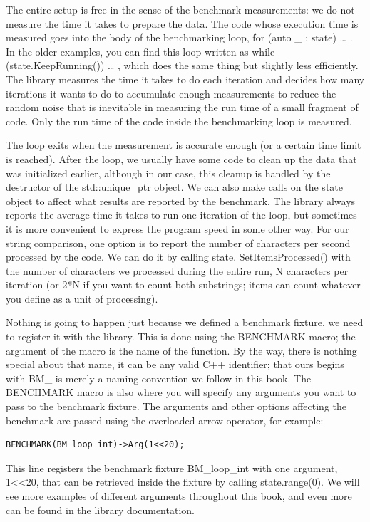The entire setup is free in the sense of the benchmark measurements: we do not measure the time it takes to prepare the data. The code whose execution time is measured goes into the body of the benchmarking loop, for (auto \_ : state) { … }. In the older examples, you can find this loop written as while (state.KeepRunning()) { … }, which does the same thing but slightly less efficiently. The library measures the time it takes to do each iteration and decides how many iterations it wants to do to accumulate enough measurements to reduce the random noise that is inevitable in measuring the run time of a small fragment of code. Only the run time of the code inside the benchmarking loop is measured.

The loop exits when the measurement is accurate enough (or a certain time limit is reached). After the loop, we usually have some code to clean up the data that was initialized earlier, although in our case, this cleanup is handled by the destructor of the std::unique\_ptr object. We can also make calls on the state object to affect what results are reported by the benchmark. The library always reports the average time it takes to run one iteration of the loop, but sometimes it is more convenient to express the program speed in some other way. For our string comparison, one option is to report the number of characters per second processed by the code. We can do it by calling state. SetItemsProcessed() with the number of characters we processed during the entire run, N characters per iteration (or 2*N if you want to count both substrings; items can count whatever you define as a unit of processing).

Nothing is going to happen just because we defined a benchmark fixture, we need to register it with the library. This is done using the BENCHMARK macro; the argument of the macro is the name of the function. By the way, there is nothing special about that name, it can be any valid C++ identifier; that ours begins with BM\_ is merely a naming convention we follow in this book. The BENCHMARK macro is also where you will specify any arguments you want to pass to the benchmark fixture. The arguments and other options affecting the benchmark are passed using the overloaded arrow operator, for example:

\begin{lstlisting}[style=styleCXX]
BENCHMARK(BM_loop_int)->Arg(1<<20);
\end{lstlisting}

This line registers the benchmark fixture BM\_loop\_int with one argument, 1<<20, that can be retrieved inside the fixture by calling state.range(0). We will see more examples of different arguments throughout this book, and even more can be found in the library documentation.

